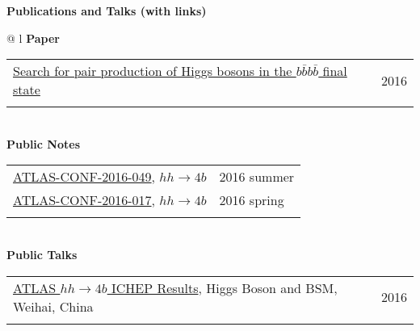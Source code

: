 \documentclass[letterpaper,11pt,oneside]{article}
\newcommand{\blue}[1]{\textcolor[rgb]{0,0,0.9}{#1}}
\begin{document}
\newpage
\raggedright
 \textbf{\Large{Publications and Talks (with links)}} \\
\vspace{-0.5cm}
\normalsize
\begin{flushleft}
\hspace{1cm}
 \begin{tabular}{@{} l}
    \textbf{Paper} \\ 
    \begin{tabular}{@{} l l }
    \blue{\href{http://arxiv.org/abs/1606.04782}{Search for pair production of Higgs bosons in the $b\bar{b}b\bar{b}$ final state}} & 2016 \\
    \hspace{0.8\linewidth} & \hspace{0.1\linewidth} \\
     \end{tabular}
     \\
    \textbf{Public Notes} \\ 
    \begin{tabular}{@{} l l }
    \blue{\href{https://atlas.web.cern.ch/Atlas/GROUPS/PHYSICS/CONFNOTES/ATLAS-CONF-2016-049/}{ATLAS-CONF-2016-049}}, $hh\to4b$ & 2016 summer\\
    \blue{\href{https://atlas.web.cern.ch/Atlas/GROUPS/PHYSICS/CONFNOTES/ATLAS-CONF-2016-017/}{ATLAS-CONF-2016-017}}, $hh\to4b$ & 2016 spring\\
    \hspace{0.8\linewidth} & \hspace{0.1\linewidth} \\
     \end{tabular}
     \\
     \textbf{Public Talks} \\
     \begin{tabular}{@{} l l }
     \blue{\href{http://indico.ihep.ac.cn/event/5635/session/86/contribution/40}{ATLAS $hh\to4b$ ICHEP Results}}, Higgs Boson and BSM, Weihai, China & 2016\\
    \hspace{0.8\linewidth} & \hspace{0.1\linewidth} \\
      \end{tabular}

\end{tabular}
\end{flushleft}
\end{document}
